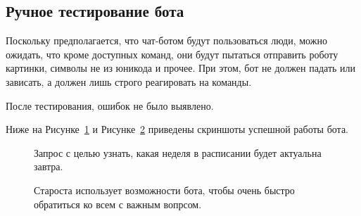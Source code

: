 \documentclass[bachelor, och, coursework, times]{SCWorks}
\begin{document}
\subsection {Ручное тестирование бота}

Поскольку предполагается, что чат-ботом будут пользоваться люди, можно ожидать, что
кроме доступных команд, они будут пытаться отправить роботу картинки, символы не из юникода и прочее.
При этом, бот не должен падать или зависать, а должен лишь строго реагировать на команды.\cite{Test}

После тестирования, ошибок не было выявлено.

Ниже на Рисунке~\ref{ris:pair} и Рисунке~\ref{ris:all} приведены скриншоты успешной работы бота.

\begin{figure}[h]
\caption{Запрос с целью узнать, какая неделя в расписании будет актуальна завтра.}
\label{ris:pair}
\end{figure}

\begin{figure}[h]
\caption{Староста использует возможности бота, чтобы очень быстро обратиться ко всем с важным вопрсом.}
\label{ris:all}
\end{figure}
\end{document}
